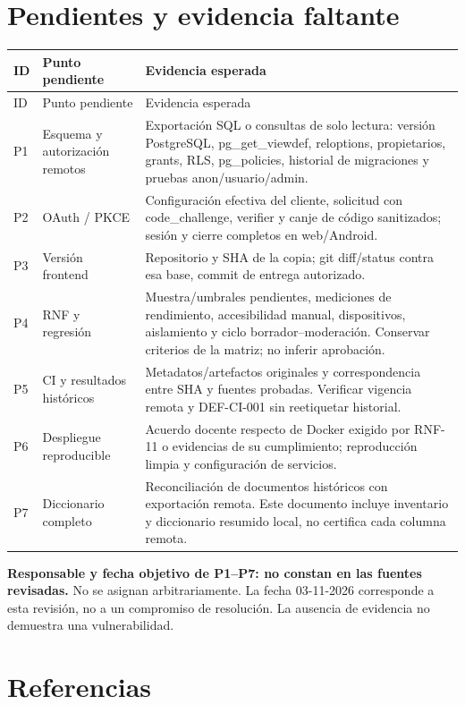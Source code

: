 \documentclass[11pt,a4paper]{article}
\begin{document}
\section{Pendientes y evidencia faltante}
\begin{longtable}{p{1cm}p{5cm}p{7.5cm}}
\toprule ID & Punto pendiente & Evidencia esperada \\\midrule\endfirsthead
\toprule ID & Punto pendiente & Evidencia esperada \\\midrule\endhead
P1 & Esquema y autorización remotos & Exportación SQL o consultas de solo lectura: versión PostgreSQL, pg\_get\_viewdef, reloptions, propietarios, grants, RLS, pg\_policies, historial de migraciones y pruebas anon/usuario/admin. \\
P2 & OAuth / PKCE & Configuración efectiva del cliente, solicitud con code\_challenge, verifier y canje de código sanitizados; sesión y cierre completos en web/Android. \\
P3 & Versión frontend & Repositorio y SHA de la copia; git diff/status contra esa base, commit de entrega autorizado. \\
P4 & RNF y regresión & Muestra/umbrales pendientes, mediciones de rendimiento, accesibilidad manual, dispositivos, aislamiento y ciclo borrador--moderación. Conservar criterios de la matriz; no inferir aprobación. \\
P5 & CI y resultados históricos & Metadatos/artefactos originales y correspondencia entre SHA y fuentes probadas. Verificar vigencia remota y DEF-CI-001 sin reetiquetar historial. \\
P6 & Despliegue reproducible & Acuerdo docente respecto de Docker exigido por RNF-11 o evidencias de su cumplimiento; reproducción limpia y configuración de servicios. \\
P7 & Diccionario completo & Reconciliación de documentos históricos con exportación remota. Este documento incluye inventario y diccionario resumido local, no certifica cada columna remota. \\
\bottomrule\end{longtable}
\textbf{Responsable y fecha objetivo de P1--P7: no constan en las fuentes revisadas.}
No se asignan arbitrariamente. La fecha 03-11-2026 corresponde a esta revisión,
no a un compromiso de resolución. La ausencia de evidencia no demuestra una vulnerabilidad.
\FloatBarrier
\clearpage
\section*{Referencias}
\end{document}
